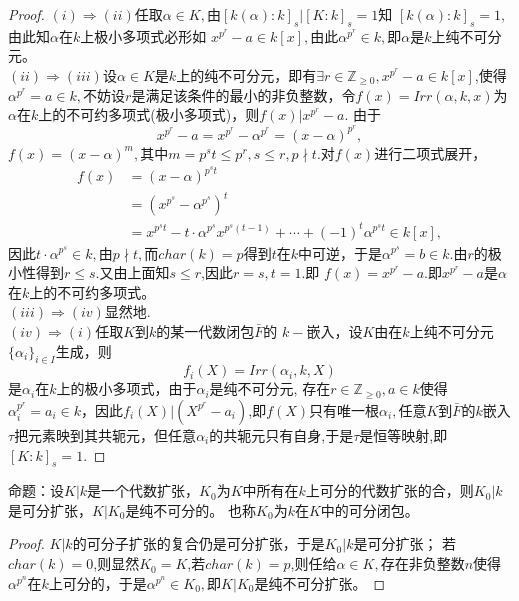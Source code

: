\documentclass[UTF8]{article}
\begin{document}
\begin{proof}
	$(i)\Rightarrow (ii)$任取$\alpha\in K,$由$[k(\alpha):k]_{s}|[K:k]_{s}=1$知
	$[k(\alpha):k]_{s}=1,$由此知$\alpha$在$k$上极小多项式必形如
	$x^{p^{r}}-a\in k[x],$由此$\alpha^{p^{r}}\in k,$即$\alpha$是$k$上纯不可分元。\\
	$(ii)\Rightarrow (iii)$设$\alpha\in K$是$k$上的纯不可分元，即有$\exists r\in \mathbb{Z}_{\geq 0},x^{p^{r}}-a\in k[x]$,使得$\alpha^{p^{r}}=a\in k,$不妨设$r$是满足该条件的最小的非负整数，令$f(x)=Irr(\alpha,k,x)$为$\alpha$在$k$上的不可约多项式(极小多项式)，则$f(x)|x^{p^{r}}-a.$
	由于
	$$x^{p^{r}}-a=x^{p^{r}}-\alpha^{p^{r}}=(x-\alpha)^{p^{r}},$$
	$f(x)=(x-\alpha)^{m},$其中$m=p^{s}t\leq p^{r},s\leq r,p\nmid t.$对$f(x)$进行二项式展开，
	\[
	\begin{split}
	f(x)&=(x-\alpha)^{p^{s}t}\\
	&=(x^{p^{s}}-\alpha^{p^{s}})^{t}\\
	&=x^{p^{s}t}-t\cdot \alpha^{p^{s}}x^{p^{s}(t-1)}+\cdots+(-1)^{t}\alpha^{p^{s}t}\in k[x],
	\end{split}		
	\]
	因此$t\cdot \alpha^{p^{s}}\in k,$由$p\nmid t,$而$char(k)=p$得到$t$在$k$中可逆，于是$\alpha^{p^{s}}=b\in k$.由$r$的极小性得到$r\leq s.$又由上面知$s\leq r$,因此$r=s,t=1.$即
	$f(x)=x^{p^{r}}-a$.即$x^{p^{r}}-a$是$\alpha$在$k$上的不可约多项式。\\
	$(iii)\Rightarrow(iv)$显然地.\\
	$(iv)\Rightarrow (i)$任取$K$到$k$的某一代数闭包$\bar{F}$的
	$k-$嵌入，设$K$由在$k$上纯不可分元$\{\alpha_{i}\}_{i\in I}$生成，则
	$$
	f_{i}(X)=Irr(\alpha_{i},k,X)
	$$
	是$\alpha_{i}$在$k$上的极小多项式，由于$\alpha_{i}$是纯不可分元,
	存在$r\in \mathbb{Z}_{\geq 0},a\in k$使得$\alpha_{i}^{p^{r}}= a_{i}\in k$，因此$f_{i}(X)|(X^{p^{r}}-a_{i})$,即$f(X)$只有唯一根$\alpha_{i},$任意$K$到$\bar{F}$的$k$嵌入$\tau$把元素映到其共轭元，但任意$\alpha_{i}$的共轭元只有自身,于是$\tau$是恒等映射,即$[K:k]_{s}=1.$
\end{proof}

命题：设$K|k$是一个代数扩张，$K_{0}$为$K$中所有在$k$上可分的代数扩张的合，则$K_{0}|k$是可分扩张，$K|K_{0}$是纯不可分的。
也称$K_{0}$为$k$在$K$中的可分闭包。\\
\begin{proof}
	
	$K|k$的可分子扩张的复合仍是可分扩张，于是$K_{0}|k$是可分扩张；
	若$char(k)=0$,则显然$K_{0}=K$,若$char(k)=p$,则任给$\alpha\in K,$存在非负整数$n$使得$\alpha^{p^{n}}$在$k$上可分的，于是$\alpha^{p^{n}}\in K_{0},$即$K|K_{0}$是纯不可分扩张。
\end{proof}
\end{document}
